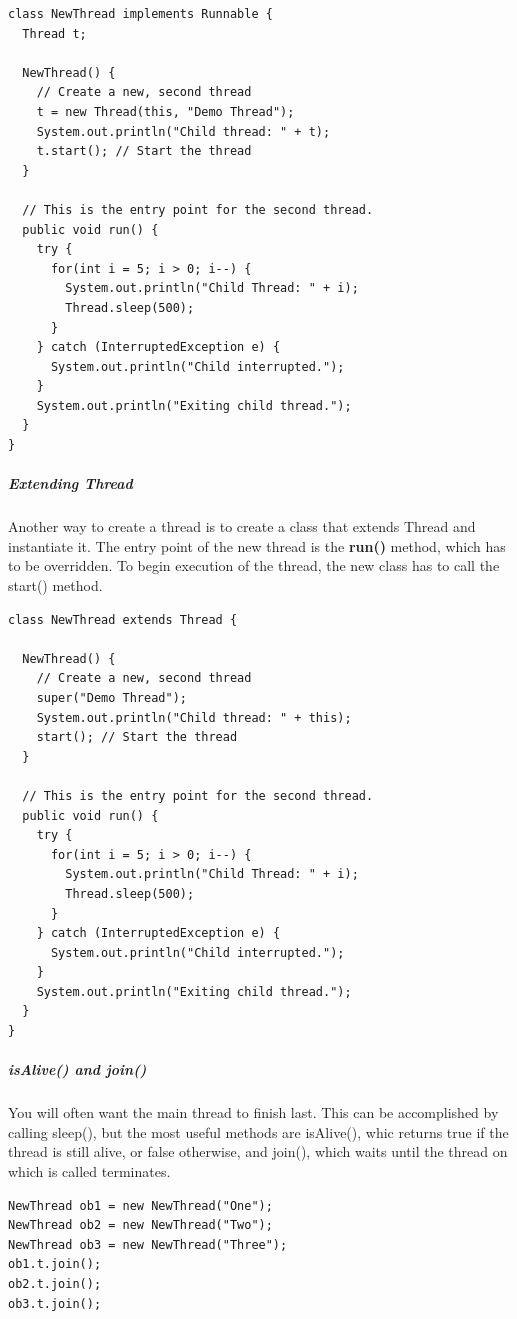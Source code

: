 \begin{lstlisting}
class NewThread implements Runnable {
  Thread t;

  NewThread() {
    // Create a new, second thread
    t = new Thread(this, "Demo Thread");
    System.out.println("Child thread: " + t);
    t.start(); // Start the thread
  }

  // This is the entry point for the second thread.
  public void run() {
    try {
      for(int i = 5; i > 0; i--) {
        System.out.println("Child Thread: " + i);
        Thread.sleep(500);
      }
    } catch (InterruptedException e) {
      System.out.println("Child interrupted.");
    }
    System.out.println("Exiting child thread.");
  }
}
\end{lstlisting}

\subparagraph{Extending Thread}
Another way to create a thread is to create a class that extends Thread and instantiate it. The entry point of the new thread is the \textbf{run()} method, which has to be overridden. To begin execution of the thread, the new class has to call the start() method.

\begin{lstlisting}
class NewThread extends Thread {

  NewThread() {
    // Create a new, second thread
    super("Demo Thread");
    System.out.println("Child thread: " + this);
    start(); // Start the thread
  }

  // This is the entry point for the second thread.
  public void run() {
    try {
      for(int i = 5; i > 0; i--) {
        System.out.println("Child Thread: " + i);
        Thread.sleep(500);
      }
    } catch (InterruptedException e) {
      System.out.println("Child interrupted.");
    }
    System.out.println("Exiting child thread.");
  }
}
\end{lstlisting}

\subparagraph{isAlive() and join()}

You will often want the main thread to finish last. This can be accomplished by calling sleep(), but the most useful methods are isAlive(), whic returns true if the thread is still alive, or false otherwise, and join(), which waits until the thread on which is called terminates.

\begin{lstlisting}
NewThread ob1 = new NewThread("One");
NewThread ob2 = new NewThread("Two");
NewThread ob3 = new NewThread("Three");
ob1.t.join();
ob2.t.join();
ob3.t.join();
\end{lstlisting}

